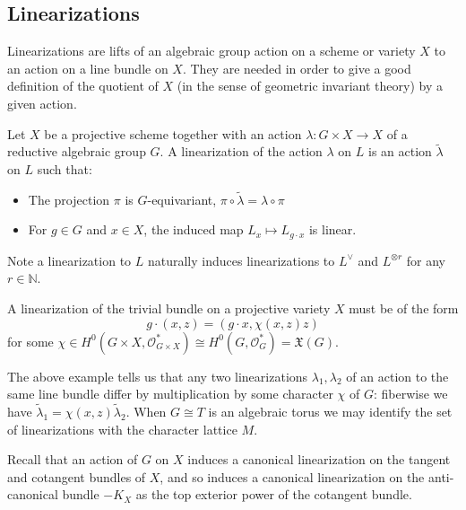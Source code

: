\subsection{Linearizations} \label{basics:linearizations}
Linearizations are lifts of an algebraic group action on a scheme or variety \(X\) to an action on a line bundle on \(X\). They are needed in order to give a good definition of the quotient of \(X\) (in the sense of geometric invariant theory) by a given action.
\begin{definition}
 Let \(X\) be a projective scheme together with an action \( \lambda : G \times X \to X\) of a reductive algebraic group \(G\). A linearization of the action \(\lambda\) on \(L\) is an action \(\tilde{\lambda}\) on \(L\) such that:
\begin{itemize}
\item The projection \(\pi\) is \(G\)-equivariant, \(\pi \circ \tilde{\lambda} = \lambda \circ \pi \)
\item For \(g \in G\) and \(x \in X\), the induced map \(L_x \mapsto L_{g \cdot x}\) is linear.
\end{itemize}
\end{definition}
%
%
%
Note a linearization to \(L\) naturally induces linearizations to \(L^\vee\) and \(L^{\otimes r}\) for any \(r \in \mathbb{N}\).
%
%
%
\begin{example}
A linearization of the trivial bundle on a projective variety \(X\) must be of the form
\[
g \cdot (x,z) = (g \cdot x, \chi(x,z)z)
\]
for some \(\chi \in H^0(G \times X, \mathcal{O}_{G \times X}^*) \cong H^0(G, \mathcal{O}_G^*) = \mathfrak{X}(G).\)
\end{example}
The above example tells us that any two linearizations \(\lambda_1,\lambda_2\) of an action to the same line bundle differ by multiplication by some character \(\chi\) of \(G\): fiberwise we have \(\tilde{\lambda}_1 = \chi(x,z) \tilde{\lambda}_2\). When \(G \cong T\) is an algebraic torus we may identify the set of linearizations with the character lattice \(M\).
\begin{example}
Recall that an action of \(G\) on \(X\) induces a canonical linearization on the tangent and cotangent bundles of \(X\), and so induces a canonical linearization on the anti-canonical bundle \(-K_X\) as the top exterior power of the cotangent bundle.
\end{example}
